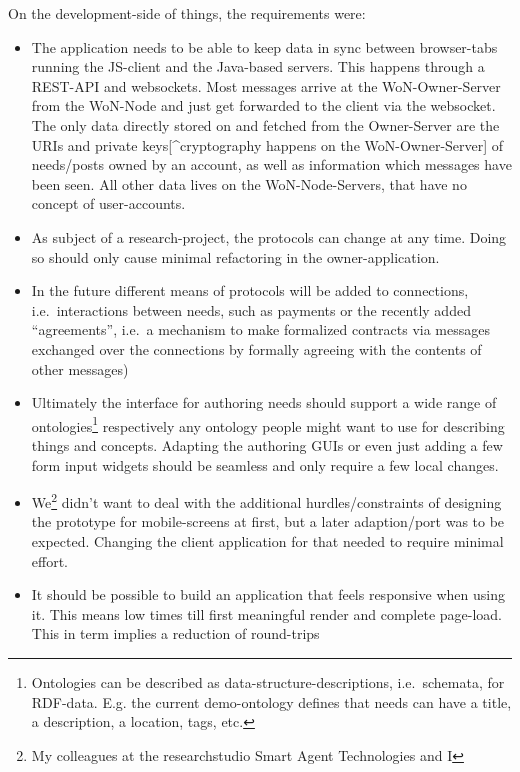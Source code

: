\documentclass[a4paper,,tablecaptionabove]{scrbook}
\providecommand{\tightlist}{%
  \setlength{\itemsep}{0pt}\setlength{\parskip}{0pt}}
\begin{document}
On the development-side of things, the requirements were:

\begin{itemize}
\tightlist
\item
  The application needs to be able to keep data in sync between
  browser-tabs running the JS-client and the Java-based servers. This
  happens through a REST-API and websockets. Most messages arrive at the
  WoN-Owner-Server from the WoN-Node and just get forwarded to the
  client via the websocket. The only data directly stored on and fetched
  from the Owner-Server are the URIs and private keys{[}\^{}cryptography
  happens on the WoN-Owner-Server{]} of needs/posts owned by an account,
  as well as information which messages have been seen. All other data
  lives on the WoN-Node-Servers, that have no concept of user-accounts.
\item
  As subject of a research-project, the protocols can change at any
  time. Doing so should only cause minimal refactoring in the
  owner-application.
\item
  In the future different means of protocols will be added to
  connections, i.e.~interactions between needs, such as payments or the
  recently added \enquote{agreements}, i.e.~a mechanism to make
  formalized contracts via messages exchanged over the connections by
  formally agreeing with the contents of other messages)
\item
  Ultimately the interface for authoring needs should support a wide
  range of ontologies\footnote{Ontologies can be described as
    data-structure-descriptions, i.e.~schemata, for RDF-data. E.g. the
    current demo-ontology defines that needs can have a title, a
    description, a location, tags, etc.} respectively any ontology
  people might want to use for describing things and concepts. Adapting
  the authoring GUIs or even just adding a few form input widgets should
  be seamless and only require a few local changes.
\item
  We\footnote{My colleagues at the researchstudio Smart Agent
    Technologies and I} didn't want to deal with the additional
  hurdles/constraints of designing the prototype for mobile-screens at
  first, but a later adaption/port was to be expected. Changing the
  client application for that needed to require minimal effort.
\item
  It should be possible to build an application that feels responsive
  when using it. This means low times till first meaningful render and
  complete page-load. This in term implies a reduction of round-trips

\end{itemize}
\end{document}
